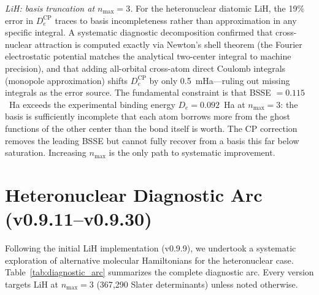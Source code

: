 \documentclass[aps,pra,twocolumn,superscriptaddress,longbibliography,floatfix]{revtex4-2}
\begin{document}
\emph{LiH: basis truncation at $n_{\max}=3$.}
For the heteronuclear diatomic LiH, the 19\% error in
$D_e^{\text{CP}}$ traces to basis incompleteness rather than
approximation in any specific integral. A systematic diagnostic
decomposition confirmed that cross-nuclear attraction is computed
exactly via Newton's shell theorem (the Fourier electrostatic
potential matches the analytical two-center integral to machine
precision), and that adding all-orbital cross-atom direct Coulomb
integrals (monopole approximation) shifts $D_e^{\text{CP}}$ by only
0.5~mHa---ruling out missing integrals as the error source.
The fundamental constraint is that BSSE $= 0.115$~Ha exceeds the
experimental binding energy $D_e = 0.092$~Ha at $n_{\max}=3$:
the basis is sufficiently incomplete that each atom borrows more
from the ghost functions of the other center than the bond itself
is worth. The CP correction removes the leading BSSE but cannot
fully recover from a basis this far below saturation. Increasing
$n_{\max}$ is the only path to systematic improvement.

\section{Heteronuclear Diagnostic Arc (v0.9.11--v0.9.30)}
\label{sec:diagnostic_arc}

Following the initial LiH implementation (v0.9.9), we undertook a
systematic exploration of alternative molecular Hamiltonians for the
heteronuclear case.  Table~\ref{tab:diagnostic_arc} summarizes the
complete diagnostic arc.  Every version targets LiH at $n_{\max}=3$
(367{,}290 Slater determinants) unless noted otherwise.
\end{document}
